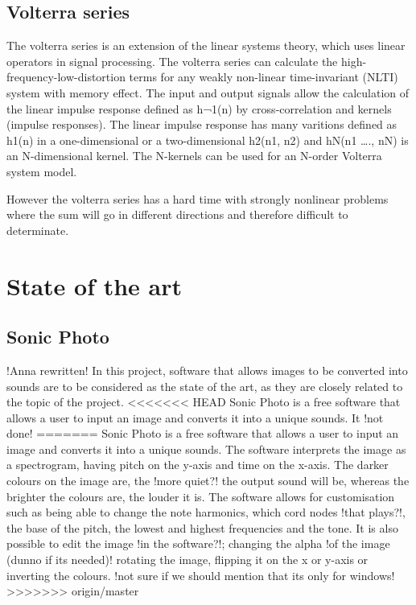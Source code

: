 \subsection{Volterra series}\label{sub:Volt}

The volterra series is an extension of the linear systems theory, which uses linear operators in signal processing. The volterra series can calculate the high-frequency-low-distortion terms for any weakly non-linear time-invariant (NLTI) system with memory effect.  The input and output signals allow the calculation of the linear impulse response defined as h¬1(n) by cross-correlation and kernels (impulse responses). The linear impulse response has many varitions defined as h1(n) in a one-dimensional or a two-dimensional h2(n1, n2) and hN(n1 …., nN) is an N-dimensional kernel. The N-kernels can be used for an N-order Volterra system model. 


However the volterra series has a hard time with strongly nonlinear problems where the sum will go in different directions and therefore difficult to determinate. 


\section{State of the art}\label{sec:stateart}

\subsection{Sonic Photo}\label{sub:sonic}
!Anna rewritten!
In this project, software that allows images to be converted into sounds are to be considered as the state of the art, as they are closely related to the topic of the project. 
<<<<<<< HEAD
Sonic Photo is a free software that allows a user to input an image and converts it into a unique sounds. It !not done!
=======
Sonic Photo \cite{White2013} is a free software that allows a user to input an image and converts it into a unique sounds. The software interprets the image as a spectrogram, having pitch on the y-axis and time on the x-axis. 
The darker colours on the image are, the !more quiet?! the output sound will be, whereas the brighter the colours are, the louder it is. The software allows for customisation such as being able to change the note harmonics, which cord nodes !that plays?!, the base of the pitch, the lowest and highest frequencies and the tone. It is also possible to edit the image !in the software?!; changing the alpha !of the image (dunno if its needed)! rotating the image, flipping it on the x or y-axis or inverting the colours. !not sure if we should mention that its only for windows!
>>>>>>> origin/master

